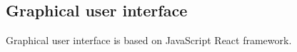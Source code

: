 \subsection{Graphical user interface}
Graphical user interface is based on JavaScript React framework.